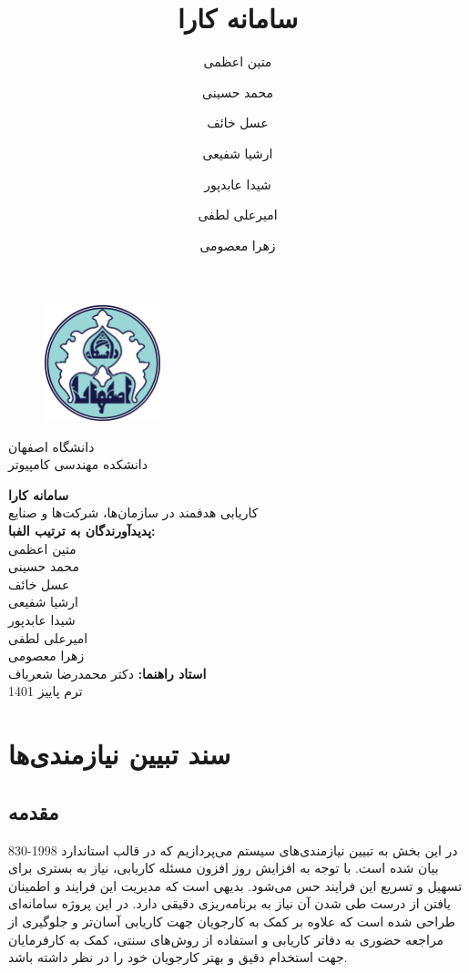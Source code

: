 \documentclass[12pt]{article}
\author{متین اعظمی}
\author{محمد حسینی}
\author{عسل خائف}
\author{ارشیا شفیعی}
\author{شیدا عابدپور}
\author{امیرعلی لطفی}
\author{زهرا معصومی}
\title{سامانه کارا}
\begin{document}
	\begin{figure}
		\centering
		\includegraphics[width=0.3\textwidth]{files/logo}
	\end{figure}
	\begin{center}
		دانشگاه اصفهان\\
		دانشکده مهندسی کامپیوتر
		\vspace{2\baselineskip}

		{\Huge \textbf{سامانه کارا}}\\

		\vspace{1\baselineskip}
		کاریابی هدفمند در سازمان‌ها، شرکت‌ها و صنایع\\
		\vspace{2\baselineskip}
		\textbf{پدیدآورندگان به ترتیب الفبا:}\\
		متین اعظمی\\
		محمد حسینی\\
		عسل خائف\\
		ارشیا شفیعی\\
		شیدا عابدپور\\
		امیرعلی لطفی\\
		زهرا معصومی\\

		\vspace{1\baselineskip}
		{\textbf{استاد راهنما:}}
		دکتر محمدرضا شعرباف\\
		\vspace{2\baselineskip}
		ترم پاییز 1401

	\end{center}

	\newpage
	\tableofcontents
	\newpage

	\section{سند تبیین نیازمندی‌ها}

	\subsection{مقدمه}
	در این بخش به تبیین نیازمندی‌های سیستم می‌پردازیم که در قالب استاندارد 1998-830
	\textbf{}
	بیان شده است.
	با توجه به افزایش روز افزون مسئله کاریابی، نیاز به بستری برای تسهیل و تسریع این فرایند حس می‌شود. بدیهی است که مدیریت این فرایند و اطمینان یافتن از درست طی شدن آن نیاز به برنامه‌ریزی دقیقی دارد.
	در این پروژه سامانه‌ای طراحی شده است که علاوه بر کمک به کارجویان جهت کاریابی آسان‌تر و جلوگیری از مراجعه حضوری به دفاتر کاریابی و استفاده از روش‌های سنتی، کمک به کارفرمایان جهت استخدام دقیق و بهتر کارجویان خود را در نظر داشته باشد.
\end{document}
